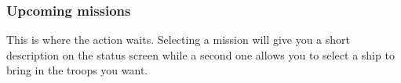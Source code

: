 \subsubsection{Upcoming missions}
This is where the action waits. Selecting a mission will give you a short description on the status screen while a second one allows you to select a ship to bring in the troops you want.